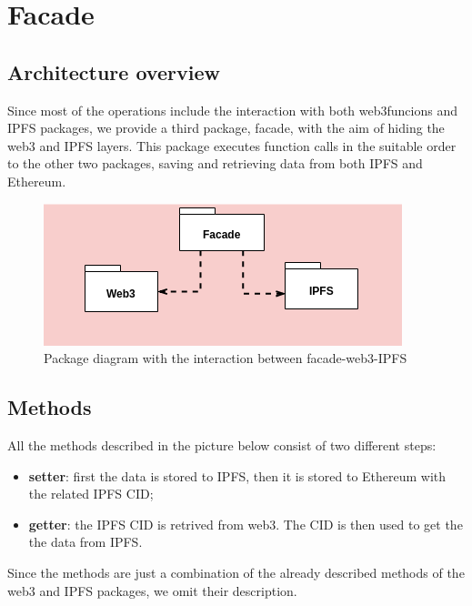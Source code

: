 \pagebreak
\section{Facade} 

\subsection{Architecture overview}

Since most of the operations include the interaction with both web3funcions and IPFS packages, we provide a third package, facade, with the aim of hiding the web3 and IPFS layers. This package executes function calls in the suitable order to the other two packages, saving and retrieving data from both IPFS and Ethereum.

\begin{figure}[h]
	\centering
	\includegraphics[scale=0.6]{res/images/facade.png}
	\caption{Package diagram with the interaction between facade-web3-IPFS}
\end{figure}

\subsection{Methods}

All the methods described in the picture below consist of two different steps:
\begin{itemize}
	\item \textbf{setter}: first the data is stored to IPFS, then it is stored to Ethereum with the related IPFS CID;
	\item \textbf{getter}: the IPFS CID is retrived from web3. The CID is then used to get the the data from IPFS. 
\end{itemize}


\noindent Since the methods are just a combination of the already described methods of the web3 and IPFS packages, we omit their description.

